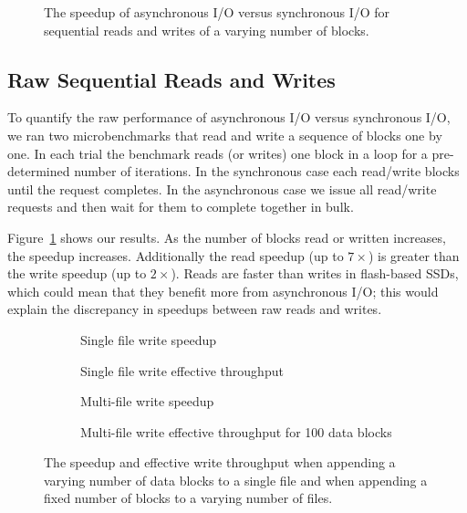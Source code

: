 \begin{figure}
  \centering
  
  \caption{The speedup of asynchronous I/O versus synchronous I/O for
    sequential reads and writes of a varying number of blocks.}
  \label{fig:raw-speedup}
\end{figure}

\subsection{Raw Sequential Reads and Writes}
To quantify the raw performance of asynchronous I/O versus synchronous I/O, we
ran two microbenchmarks that read and write a sequence of blocks one by one.
In each trial the benchmark reads (or writes) one block in a loop for a
pre-determined number of iterations. In the synchronous case each read/write
blocks until the request completes. In the asynchronous case we issue all
read/write requests and then wait for them to complete together in bulk.

Figure~\ref{fig:raw-speedup} shows our results. As the number of blocks read or
written increases, the speedup increases. Additionally the read speedup (up to
$7\times$) is greater than the write speedup (up to $2\times$). Reads are
faster than writes in flash-based SSDs, which could mean that they benefit more
from asynchronous I/O; this would explain the discrepancy in speedups between
raw reads and writes.

\begin{figure*}
\centering
\begin{subfigure}[t]{0.49\linewidth}
  
  \caption{Single file write speedup}\label{fig:single-file-speedup}
\end{subfigure}\hfill%
\begin{subfigure}[t]{0.49\linewidth}
  
  \caption{Single file write effective throughput}\label{fig:single-file-thpt}
\end{subfigure}
\par\bigskip
\begin{subfigure}[t]{0.49\linewidth}
  
  \caption{Multi-file write speedup}\label{fig:multi-file-speedup}
\end{subfigure}%
\begin{subfigure}[t]{0.49\linewidth}
  
  \caption{Multi-file write effective throughput for 100 data blocks}
  \label{fig:multi-file-thpt}
\end{subfigure}
\caption{The speedup and effective write throughput when appending a varying
number of data blocks to a single file and when appending a fixed number of
blocks to a varying number of files.}
\end{figure*}

